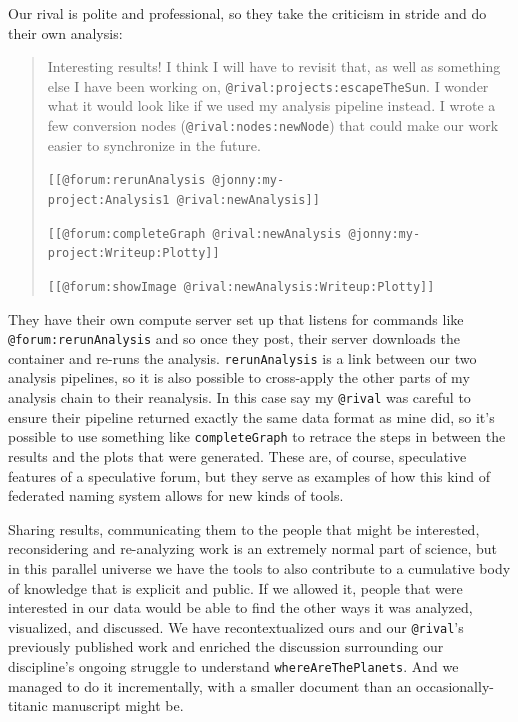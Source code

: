 \documentclass[notoc]{tufte-book}
\begin{document}
Our rival is polite and professional, so they take the criticism in
stride and do their own analysis:

\begin{quote}
Interesting results! I think I will have to revisit that, as well as
something else I have been working on,
\texttt{@rival:projects:escapeTheSun}. I wonder what it would look like
if we used my analysis pipeline instead. I wrote a few conversion nodes
(\texttt{@rival:nodes:newNode}) that could make our work easier to
synchronize in the future.

\texttt{{[}{[}@forum:rerunAnalysis\ @jonny:my-project:Analysis1\ @rival:newAnalysis{]}{]}}

\texttt{{[}{[}@forum:completeGraph\ @rival:newAnalysis\ @jonny:my-project:Writeup:Plotty{]}{]}}

\texttt{{[}{[}@forum:showImage\ @rival:newAnalysis:Writeup:Plotty{]}{]}}
\end{quote}

They have their own compute server set up that listens for commands like
\texttt{@forum:rerunAnalysis} and so once they post, their server
downloads the container and re-runs the analysis. \texttt{rerunAnalysis}
is a link between our two analysis pipelines, so it is also possible to
cross-apply the other parts of my analysis chain to their reanalysis. In
this case say my \texttt{@rival} was careful to ensure their pipeline
returned exactly the same data format as mine did, so it's possible to
use something like \texttt{completeGraph} to retrace the steps in
between the results and the plots that were generated. These are, of
course, speculative features of a speculative forum, but they serve as
examples of how this kind of federated naming system allows for new
kinds of tools.

Sharing results, communicating them to the people that might be
interested, reconsidering and re-analyzing work is an extremely normal
part of science, but in this parallel universe we have the tools to also
contribute to a cumulative body of knowledge that is explicit and
public. If we allowed it, people that were interested in our data would
be able to find the other ways it was analyzed, visualized, and
discussed. We have recontextualized ours and our \texttt{@rival}'s
previously published work and enriched the discussion surrounding our
discipline's ongoing struggle to understand \texttt{whereAreThePlanets}.
And we managed to do it incrementally, with a smaller document than an
occasionally-titanic manuscript might be.
\end{document}
